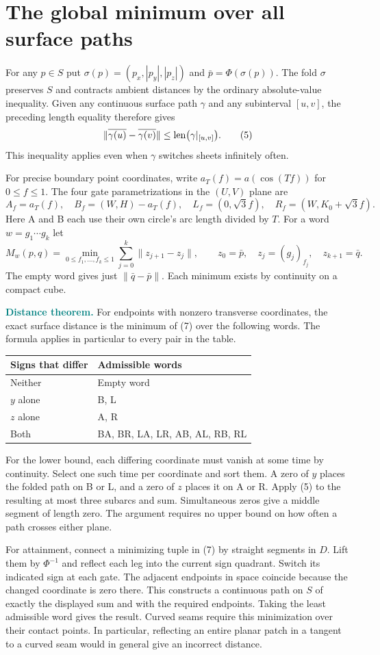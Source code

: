 \documentclass[11pt,letterpaper]{article}
\newcommand{\heading}[1]{\section*{\color{ink}#1}}
\newcommand{\para}[1]{\smallskip\noindent\textcolor{teal}{\textbf{#1}}\enspace}
\newcommand{\len}{\mathop{\rm len}}
\newcommand{\norm}[1]{\lVert #1\rVert}
\newcommand{\rt}{\sqrt{3}}
\begin{document}
\newpage
\heading{The global minimum over all surface paths}
For any $p\in S$ put $\sigma(p)=(p_x,|p_y|,|p_z|)$ and $\bar p=\Phi(\sigma(p))$. The fold $\sigma$ preserves $S$ and contracts ambient distances by the ordinary absolute-value inequality. Given any continuous surface path $\gamma$ and any subinterval $[u,v]$, the preceding length equality therefore gives
\[
 \norm{\overline{\gamma(u)}-\overline{\gamma(v)}}\le
 \len\bigl(\gamma|_{[u,v]}\bigr).
 \tag{5}
\]
This inequality applies even when $\gamma$ switches sheets infinitely often.

For precise boundary point coordinates, write $a_T(f)=a(\cos(Tf))$ for $0\le f\le1$. The four gate parametrizations in the $(U,V)$ plane are
\[
 A_f=a_T(f),\quad B_f=(W,H)-a_T(f),\quad
 L_f=(0,\rt f),\quad R_f=(W,K_0+\rt f).
 \tag{6}
\]
Here A and B each use their own circle's arc length divided by $T$. For a word $w=g_1\cdots g_k$ let
\[
 M_w(p,q)=\min_{0\le f_1,\ldots,f_k\le1}
       \sum_{j=0}^{k}\norm{z_{j+1}-z_j},\qquad
 z_0=\bar p,\quad z_j=(g_j)_{f_j},\quad z_{k+1}=\bar q .
 \tag{7}
\]
The empty word gives just $\norm{\bar q-\bar p}$. Each minimum exists by continuity on a compact cube.

\para{Distance theorem.} For endpoints with nonzero transverse coordinates, the exact surface distance is the minimum of (7) over the following words. The formula applies in particular to every pair in the table.
\begin{center}\small
\begin{tabular}{@{}ll@{}}\toprule
Signs that differ & Admissible words\\\midrule
Neither & Empty word\\
$y$ alone & B, L\\
$z$ alone & A, R\\
Both & BA, BR, LA, LR, AB, AL, RB, RL\\\bottomrule
\end{tabular}
\end{center}
For the lower bound, each differing coordinate must vanish at some time by continuity. Select one such time per coordinate and sort them. A zero of $y$ places the folded path on B or L, and a zero of $z$ places it on A or R. Apply (5) to the resulting at most three subarcs and sum. Simultaneous zeros give a middle segment of length zero. The argument requires no upper bound on how often a path crosses either plane.

For attainment, connect a minimizing tuple in (7) by straight segments in $D$. Lift them by $\Phi^{-1}$ and reflect each leg into the current sign quadrant. Switch its indicated sign at each gate. The adjacent endpoints in space coincide because the changed coordinate is zero there. This constructs a continuous path on $S$ of exactly the displayed sum and with the required endpoints. Taking the least admissible word gives the result. Curved seams require this minimization over their contact points. In particular, reflecting an entire planar patch in a tangent to a curved seam would in general give an incorrect distance.
\end{document}
